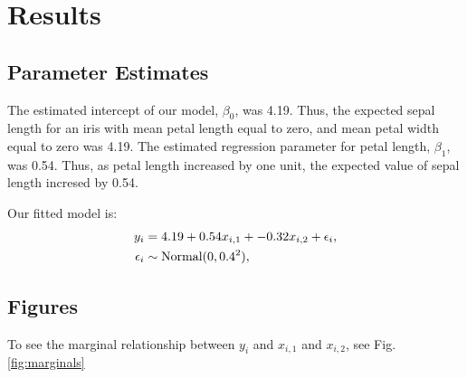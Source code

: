 \documentclass{article}\usepackage[]{graphicx}\usepackage[]{color}
\begin{document}
\section{Results}
\subsection{Parameter Estimates}
The estimated intercept of our model, $\beta_0$, was 4.19. Thus, the expected sepal length for an iris with mean petal length equal to zero, and mean petal width equal to zero was 4.19. The estimated regression parameter for petal length, $\beta_1$,  was 0.54. Thus, as petal length increased by one unit, the expected value of sepal length incresed by 0.54. 

Our fitted model is:
\begin{align}
y_i&=4.19+0.54x_{i,1}+-0.32x_{i,2}+\epsilon_i, \notag \\
\epsilon_i &\sim \text{Normal}(0,0.4^2), \notag
\end{align}

\subsection{Figures}
To see the marginal relationship between $y_i$ and $x_{i,1}$ and $x_{i,2}$, see Fig. \ref{fig:marginals}
\end{document}
